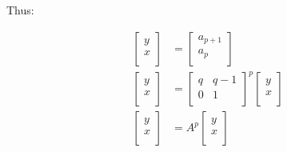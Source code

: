 \documentclass[paper.tex]{subfiles}
\begin{document}
Thus:

\begin{align*}
\left[ \begin{array}{ccc}
y \\
x \\
\end{array} \right]
&=
\left[ \begin{array}{ccc}
a_{p+1} \\
a_{p} \\
\end{array} \right] \\
\left[ \begin{array}{ccc}
y \\
x \\
\end{array} \right]
&=
\left[ \begin{array}{ccc}
q & q-1 \\
0 & 1 \\
\end{array} \right] ^{p}
\left[ \begin{array}{ccc}
y \\
x \\
\end{array} \right] \\
\left[ \begin{array}{ccc}
y \\
x \\
\end{array} \right]
&=
A^{p}
\left[ \begin{array}{ccc}
y \\
x \\
\end{array} \right] \\
\end{align*}
\end{document}
